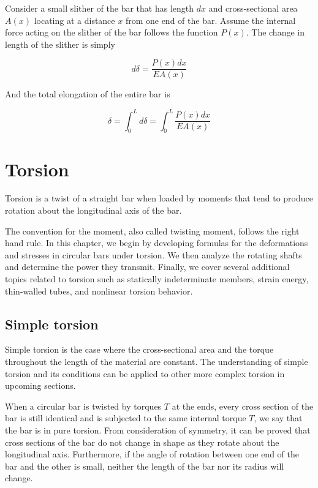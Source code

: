 \documentclass[a4paper,openany,12pt]{book}
\begin{document}
Consider a small slither of the bar that has length \(dx\) and
cross-sectional area \(A(x)\) locating at a distance \(x\) from one end of
the bar. Assume the internal force acting on the slither of the bar
follows the function \(P(x)\). The change in length of the slither is
simply


$$d\delta  = \frac{P(x)dx}{EA(x)}$$

And the total elongation of the entire bar is

$$\delta  = \int_0^L {d\delta }  = \int_0^L \frac{P(x)dx}{EA(x)}$$

\section{Torsion}
\label{torsion}
Torsion is a twist of a straight bar when loaded by moments that tend to
produce rotation about the longitudinal axis of the bar.

The convention for the moment, also called twisting moment, follows the
right hand rule. In this chapter, we begin by developing formulas for
the deformations and stresses in circular bars under torsion. We then
analyze the rotating shafts and determine the power they transmit.
Finally, we cover several additional topics related to torsion such as
statically indeterminate members, strain energy, thin-walled tubes, and
nonlinear torsion behavior.

\subsection{Simple torsion}
\label{simple-torsion}
Simple torsion is the case where the cross-sectional area and the torque
throughout the length of the material are constant. The understanding of
simple torsion and its conditions can be applied to other more complex
torsion in upcoming sections.

When a circular bar is twisted by torques \(T\) at the ends, every cross
section of the bar is still identical and is subjected to the same
internal torque \(T\), we say that the bar is in pure torsion. From
consideration of symmetry, it can be proved that cross sections of the
bar do not change in shape as they rotate about the longitudinal axis.
Furthermore, if the angle of rotation between one end of the bar and the
other is small, neither the length of the bar nor its radius will
change.
\end{document}
